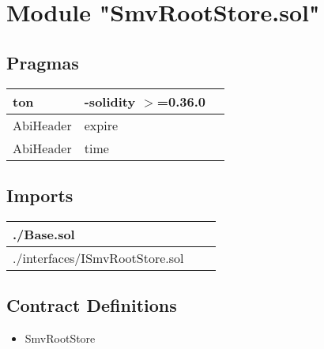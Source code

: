 
\section{Module "SmvRootStore.sol"}


\subsection{Pragmas}


\noindent\begin{tabular}{|l|l|p{5cm}|}\hline
ton & -solidity $>$=0.36.0 &\\\hline
AbiHeader &  expire &\\\hline
AbiHeader &  time &\\\hline
\end{tabular}


\subsection{Imports}


\noindent\begin{tabular}{|l|l|p{5cm}|}\hline
./Base.sol &\\\hline
./interfaces/ISmvRootStore.sol &\\\hline
\end{tabular}


\subsection{Contract Definitions}

\begin{itemize}
\item SmvRootStore
\end{itemize}
